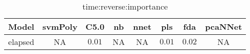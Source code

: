 \begin{table}[!ht]
	\centering
	\begin{tabular}{|c|c|c|c|c|c|c|c|}
		\hline
		Model & svmPoly & C5.0 & nb & nnet & pls & fda & pcaNNet \\ \hline
		elapsed & NA & $0.01$ & NA & NA & $0.01$ & $0.02$ & NA \\ \hline
	\end{tabular}
	\caption{time:reverse:importance}
	\label{tab:time:reverse:importance}
\end{table}
